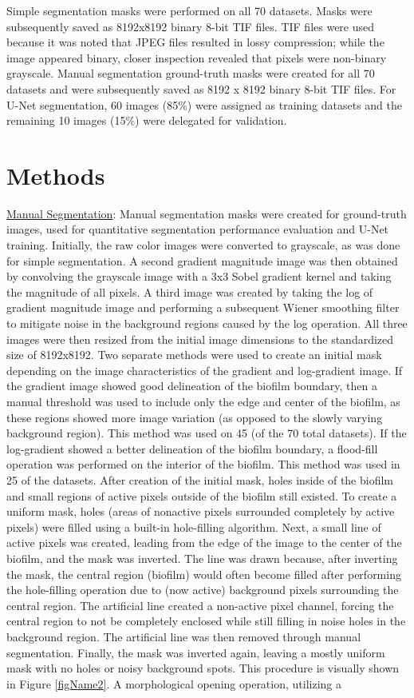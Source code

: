 \documentclass[conference]{IEEEtran}
\begin{document}
Simple segmentation masks were performed on all 70 datasets. Masks were subsequently saved as 8192x8192 binary 8-bit TIF files. TIF files were used because it was noted that JPEG files resulted in lossy compression; while the image appeared binary, closer inspection revealed that pixels were non-binary grayscale.  Manual segmentation ground-truth masks were created for all 70 datasets and were subsequently saved as 8192 x 8192 binary 8-bit TIF files. For U-Net segmentation, 60 images (85\%) were assigned as training datasets and the remaining 10 images (15\%) were delegated for validation. 

\section{Methods}
\ul{Manual Segmentation}: Manual segmentation masks were created for ground-truth images, used for quantitative segmentation performance evaluation and U-Net training. Initially, the raw color images were converted to grayscale, as was done for simple segmentation. A second gradient magnitude image was then obtained by convolving the grayscale image with a 3x3 Sobel gradient kernel and taking the magnitude of all pixels. A third image was created by taking the log of gradient magnitude image and performing a subsequent Wiener smoothing filter to mitigate noise in the background regions caused by the log operation. All three images were then resized from the initial image dimensions to the standardized size of 8192x8192. Two separate methods were used to create an initial mask depending on the image characteristics of the gradient and log-gradient image. If the gradient image showed good delineation of the biofilm boundary, then a manual threshold was used to include only the edge and center of the biofilm, as these regions showed more image variation (as opposed to the slowly varying background region). This method was used on 45 (of the 70 total datasets). If the log-gradient showed a better delineation of the biofilm boundary, a flood-fill operation was performed on the interior of the biofilm. This method was used in 25 of the datasets. After creation of the initial mask, holes inside of the biofilm and small regions of active pixels outside of the biofilm still existed. To create a uniform mask, holes (areas of nonactive pixels surrounded completely by active pixels) were filled using a built-in hole-filling algorithm. Next, a small line of active pixels was created, leading from the edge of the image to the center of the biofilm, and the mask was inverted. The line was drawn because, after inverting the mask, the central region (biofilm) would often become filled after performing the hole-filling operation due to (now active) background pixels surrounding the central region. The artificial line created a non-active pixel channel, forcing the central region to not be completely enclosed while still filling in noise holes in the background region. The artificial line was then removed through manual segmentation. Finally, the mask was inverted again, leaving a mostly uniform mask with no holes or noisy background spots. This procedure is visually shown in Figure \ref{figName2}. A morphological opening operation, utilizing a 
\end{document}
